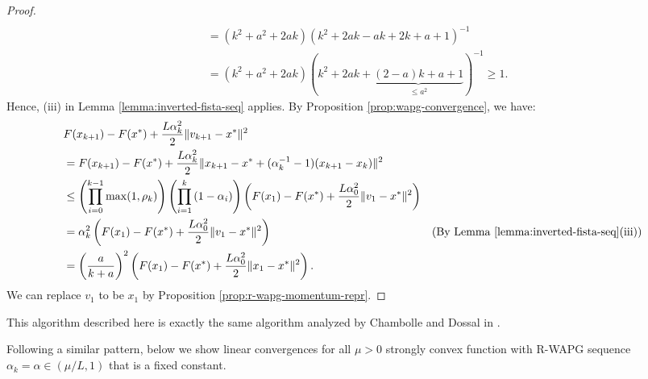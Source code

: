 \documentclass[12pt]{article}
\begin{document}
\begin{proof}
\begin{align*}
            \\
            &= (k^2 + a^2 + 2ak)(k^2 + 2ak - ak + 2k + a + 1)^{-1}
            \\
            &= (k^2 + a^2 + 2ak)(k^2 + 2ak + \underbrace{(2 - a)k + a + 1}_{\le a^2})^{-1} \ge 1.
        \end{align*}
        Hence, (iii) in Lemma \ref{lemma:inverted-fista-seq} applies.
        By Proposition \ref{prop:wapg-convergence}, we have:
        {\small\begin{align*}
            & F(x_{k + 1}) - F(x^*) + \frac{L\alpha_k^2}{2}\Vert v_{k + 1} - x^*\Vert^2
            \\
            & = F(x_{k + 1}) - F(x^*) + \frac{L\alpha_k^2}{2}\Vert x_{k + 1} - x^* + (\alpha_k^{-1} - 1)(x_{k + 1} - x_k)\Vert^2
            \\
            & \le
            \left(
                \prod_{i = 0}^{k - 1} \max(1, \rho_{k})
            \right)
            \left(
                \prod_{i = 1}^{k} \left(1  - \alpha_i\right)
            \right)
            \left(
                F(x_1) - F(x^*) + \frac{L\alpha_0^2}{2}\Vert v_1 - x^*\Vert^2
            \right)
            \\
            &=
            \alpha_k^2
            \left(
                F(x_1) - F(x^*) + \frac{L\alpha_0^2}{2}\Vert v_1 - x^*\Vert^2
            \right)
            & \text{(By Lemma \ref{lemma:inverted-fista-seq}(iii))}
            \\
            &=
            \left(\frac{a}{k + a}\right)^2
            \left(
                F(x_1) - F(x^*) + \frac{L\alpha_0^2}{2}\Vert x_1 - x^*\Vert^2
            \right).
        \end{align*}}
        We can replace $v_1$ to be $x_1$ by Proposition \ref{prop:r-wapg-momentum-repr}.
    \end{proof}
    \begin{remark}
        This algorithm described here is exactly the same algorithm analyzed by Chambolle and Dossal in \cite{chambolle_convergence_2015}.
    \end{remark}
    Following a similar pattern, below we show linear convergences for all $\mu > 0$ strongly convex function with R-WAPG sequence 
    $\alpha_k = \alpha \in (\mu/L, 1)$ that is a fixed constant.
\end{document}
